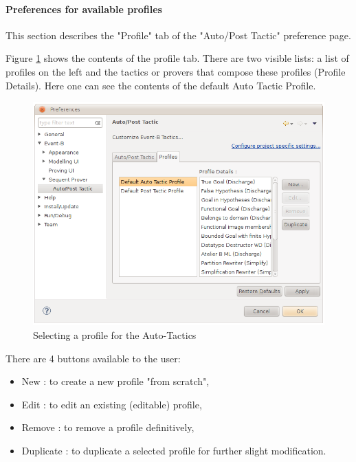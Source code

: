 
\paragraph{Preferences for available profiles}

This section describes the "Profile" tab of the "Auto/Post Tactic" preference page. 

Figure \ref{fig_ref_01_preferences9} shows the contents of the profile tab. There are two visible lists: a list of profiles on the left and the tactics or provers that compose these profiles (Profile Details). Here one can see the contents of the default Auto Tactic Profile.

\begin{figure}[!h]
\begin{center}
	\includegraphics{img/reference/ref_01_preferences9.png}
	\caption{Selecting a profile for the Auto-Tactics}
	\label{fig_ref_01_preferences9}
\end{center}
\end{figure}

There are 4 buttons available to the user:

\begin{itemize}
	\item New : to create a new profile "from scratch",
	\item Edit : to edit an existing (editable) profile,
	\item Remove : to remove a profile definitively,
	\item Duplicate : to duplicate a selected profile for further slight modification.
\end{itemize}

